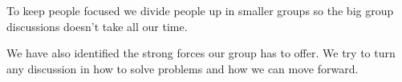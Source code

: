 To keep people focused we divide people up in smaller groups so the big group discussions doesn't take all our time.

We have also identified the strong forces our group has to offer.
We try to turn any discussion in how to solve problems and how we can move forward. 

 


